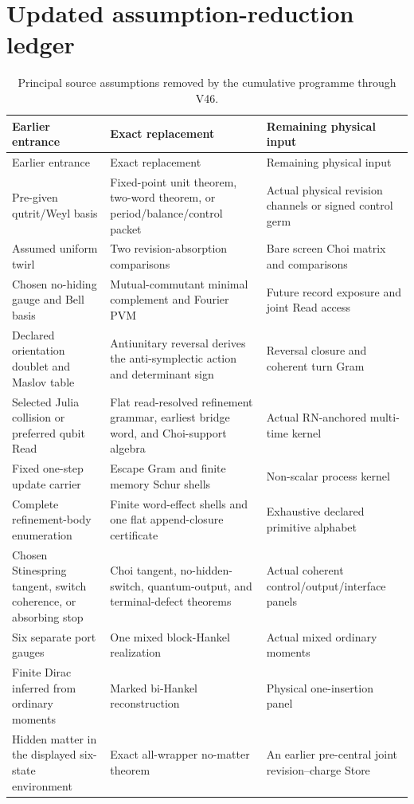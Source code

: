 \documentclass[11pt,oneside,openany]{book}
\numberwithin{equation}{chapter}
\theoremstyle{definition}
\theoremstyle{remark}
\begin{document}
\section{Updated assumption-reduction ledger}
\begin{longtable}{@{}p{}p{}p{}@{}}
\caption{Principal source assumptions removed by the cumulative programme
through V46.}\label{tab:v6-reductions}\\
\toprule
Earlier entrance & Exact replacement & Remaining physical input\\
\midrule
\endfirsthead
\toprule
Earlier entrance & Exact replacement & Remaining physical input\\
\midrule
\endhead
Pre-given qutrit/Weyl basis
& Fixed-point unit theorem, two-word theorem, or period/balance/control packet
& Actual physical revision channels or signed control germ\\
\addlinespace
Assumed uniform twirl
& Two revision-absorption comparisons
& Bare screen Choi matrix and comparisons\\
\addlinespace
Chosen no-hiding gauge and Bell basis
& Mutual-commutant minimal complement and Fourier PVM
& Future record exposure and joint Read access\\
\addlinespace
Declared orientation doublet and Maslov table
& Antiunitary reversal derives the anti-symplectic action and determinant sign
& Reversal closure and coherent turn Gram\\
\addlinespace
Selected Julia collision or preferred qubit Read
& Flat read-resolved refinement grammar, earliest bridge word, and Choi-support algebra
& Actual RN-anchored multi-time kernel\\
\addlinespace
Fixed one-step update carrier
& Escape Gram and finite memory Schur shells
& Non-scalar process kernel\\
\addlinespace
Complete refinement-body enumeration
& Finite word-effect shells and one flat append-closure certificate
& Exhaustive declared primitive alphabet\\
\addlinespace
Chosen Stinespring tangent, switch coherence, or absorbing stop
& Choi tangent, no-hidden-switch, quantum-output, and terminal-defect theorems
& Actual coherent control/output/interface panels\\
\addlinespace
Six separate port gauges
& One mixed block-Hankel realization
& Actual mixed ordinary moments\\
\addlinespace
Finite Dirac inferred from ordinary moments
& Marked bi-Hankel reconstruction
& Physical one-insertion panel\\
\addlinespace
Hidden matter in the displayed six-state environment
& Exact all-wrapper no-matter theorem
& An earlier pre-central joint revision--charge Store\\
\bottomrule
\end{longtable}
\end{document}
